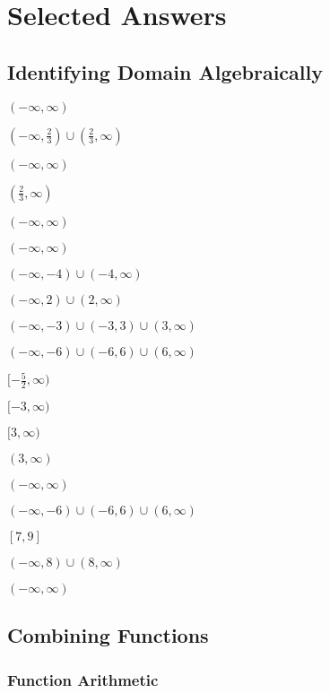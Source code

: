 \documentclass[12pt]{book}
\theoremstyle{definition}
\begin{document}
\section{Selected Answers}
\subsection*{Identifying Domain Algebraically}
\begin{oddenumerate}
\begin{multicols}{2}
\item $(-\infty,\infty)$ 
\item $(-\infty,\frac{2}{3})\cup(\frac{2}{3},\infty)$
\item $(-\infty,\infty)$
\item $(\frac{2}{3},\infty)$
\item $(-\infty,\infty)$
\item $(-\infty,\infty)$
\item $(-\infty,-4)\cup(-4,\infty)$
\item $(-\infty,2)\cup(2,\infty)$
\item $(-\infty,-3)\cup(-3,3)\cup(3,\infty)$
\item $(-\infty,-6)\cup(-6,6)\cup(6,\infty)$
\item $[-\frac{5}{2},\infty)$
\item $[-3,\infty)$
\item $[3,\infty)$
\item $(3,\infty)$
\item $(-\infty,\infty)$
\item $(-\infty,-6)\cup(-6,6)\cup(6,\infty)$
\item $[7,9]$
\item $(-\infty,8)\cup(8,\infty)$
\item $(-\infty,\infty)$
\end{multicols}
\end{oddenumerate}

\subsection*{Combining Functions}
\subsubsection{Function Arithmetic}
\end{document}

